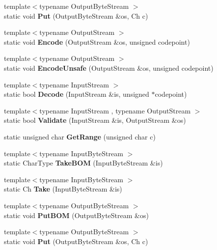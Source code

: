 \begin{DoxyCompactItemize}
{\footnotesize template$<$typename Output\+Byte\+Stream $>$ }\\static void {\bfseries Put} (Output\+Byte\+Stream \&os, Ch c)
\item 
\mbox{\label{structUTF8_af286ed19ca60d261a9b11b65bee1298b}} 
{\footnotesize template$<$typename Output\+Stream $>$ }\\static void {\bfseries Encode} (Output\+Stream \&os, unsigned codepoint)
\item 
\mbox{\label{structUTF8_aac6bdaf03c114265384b2ae3e425e7a8}} 
{\footnotesize template$<$typename Output\+Stream $>$ }\\static void {\bfseries Encode\+Unsafe} (Output\+Stream \&os, unsigned codepoint)
\item 
\mbox{\label{structUTF8_a17c6badb31acf4f784111c886737fb17}} 
{\footnotesize template$<$typename Input\+Stream $>$ }\\static bool {\bfseries Decode} (Input\+Stream \&is, unsigned $\ast$codepoint)
\item 
\mbox{\label{structUTF8_a9e2e7e37d819baeb5e643654c6e61e33}} 
{\footnotesize template$<$typename Input\+Stream , typename Output\+Stream $>$ }\\static bool {\bfseries Validate} (Input\+Stream \&is, Output\+Stream \&os)
\item 
\mbox{\label{structUTF8_ac06bbf38df41adb0c7b9eaa93f85cc38}} 
static unsigned char {\bfseries Get\+Range} (unsigned char c)
\item 
\mbox{\label{structUTF8_a1b2359d6ea50ae32fefc9b28e9878a31}} 
{\footnotesize template$<$typename Input\+Byte\+Stream $>$ }\\static Char\+Type {\bfseries Take\+B\+OM} (Input\+Byte\+Stream \&is)
\item 
\mbox{\label{structUTF8_a5b2561a5031c8a699e593cd51b2c6864}} 
{\footnotesize template$<$typename Input\+Byte\+Stream $>$ }\\static Ch {\bfseries Take} (Input\+Byte\+Stream \&is)
\item 
\mbox{\label{structUTF8_a6b171e5f0662ad81d498875bbdbc536a}} 
{\footnotesize template$<$typename Output\+Byte\+Stream $>$ }\\static void {\bfseries Put\+B\+OM} (Output\+Byte\+Stream \&os)
\item 
\mbox{\label{structUTF8_ab24c23227413798e9be28a21eb26fe51}} 
{\footnotesize template$<$typename Output\+Byte\+Stream $>$ }\\static void {\bfseries Put} (Output\+Byte\+Stream \&os, Ch c)
\end{DoxyCompactItemize}


